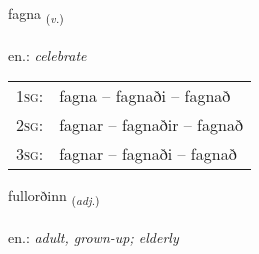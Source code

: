 \documentclass[frontgrid, backgrid]{flacards}\usepackage[]{graphicx}\usepackage[]{xcolor}
\begin{document}
\renewcommand{\flhead}{\vskip5pt \fboxsep=0pt {\small\bfseries\footnotesize Sagnorð | Verb}}
\renewcommand{\fcfoot}{\vskip5pt \fboxsep=0pt \hspace{2pt}{\small\bfseries\footnotesize 2K}}

\renewcommand{\blhead}{\vskip5pt {\small\bfseries\footnotesize Sagnorð | Verb }}
\renewcommand{\bcfoot}{\vskip5pt \hspace{2pt}{\small\bfseries\footnotesize 2K}}


{fagna \small{\textsubscript{(\textit{v.})}} \\[1ex] %
\textphonetic{[fakna]} \\
en.: \emph{celebrate} \\  [2ex]
\renewcommand*{\arraystretch}{0.8}
\begin{tabular}{p{1cm}l}
\textsc{1sg}: & fagna -- fagnaði -- fagnað \\ 
\textsc{2sg}: & fagnar -- fagnaðir -- fagnað \\ 
\textsc{3sg}: & fagnar -- fagnaði -- fagnað \\ 
\end{tabular}
}

\renewcommand{\flhead}{\vskip5pt \fboxsep=0pt {\small\bfseries\footnotesize Lýsingarorð | Adjective}}
\renewcommand{\fcfoot}{\vskip5pt \fboxsep=0pt \hspace{2pt}{\small\bfseries\footnotesize 2K}}

\renewcommand{\blhead}{\vskip5pt {\small\bfseries\footnotesize Lýsingarorð | Adjective }}
\renewcommand{\bcfoot}{\vskip5pt \hspace{2pt}{\small\bfseries\footnotesize 2K}}


{fullorðinn \small{\textsubscript{(\textit{adj.})}} \\[1ex] %
\textphonetic{[fʏtlɔrðɪn]} \\
en.: \emph{adult, grown-up; elderly} \\  [2ex]
\renewcommand*{\arraystretch}{0.8}
}
\end{document}
